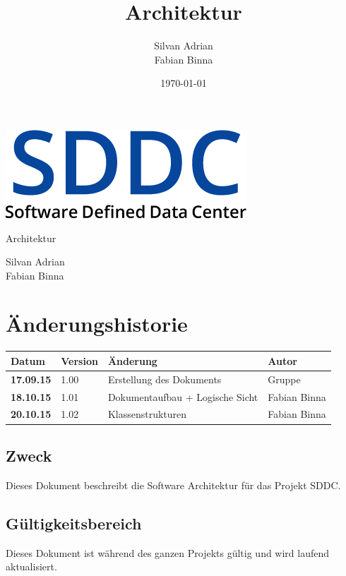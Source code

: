 \documentclass[11pt]{scrartcl}
\title{Architektur}
\author{Silvan Adrian \\ Fabian Binna}
\date{\today{}}
\begin{document}
\def\arraystretch{1.5}
\begin{titlepage}
\begin{center}
\vspace{10em}
\includegraphics[scale=2]{SDDC}
\vspace{10em}
\end{center}
\begin{center}
\huge {Architektur}
\end{center}
\begin{center}
\vspace{10em}
\LARGE {Silvan Adrian} \\
\LARGE {Fabian Binna}
\end{center}

\end{titlepage}

\newpage
\section{Änderungshistorie}
\begin{tabularx}{\linewidth}{l l X l}
\textbf{Datum} & \textbf{Version} & \textbf{Änderung}  & \textbf{Autor} \\
\hline
\textbf{17.09.15} & 1.00 & Erstellung des Dokuments & Gruppe \\
\textbf{18.10.15} & 1.01 & Dokumentaufbau + Logische Sicht & Fabian Binna\\
\textbf{20.10.15} & 1.02 & Klassenstrukturen & Fabian Binna\\

\end{tabularx}

\newpage
\tableofcontents
\newpage

\subsection{Zweck}
Dieses Dokument beschreibt die Software Architektur für das Projekt SDDC.
\subsection{Gültigkeitsbereich}
Dieses Dokument ist während des ganzen Projekts gültig und wird laufend aktualisiert.
\end{document}

